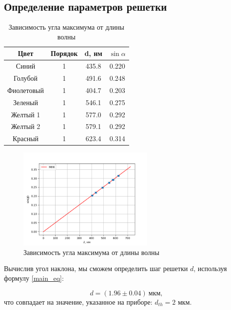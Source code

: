 \documentclass[a4paper]{article}
\begin{document}
\subsection{Определение параметров решетки}

\begin{table}[]
    \centering
    \begin{tabular}{|c|c|c|c|}
    \hline
    Цвет       & Порядок & d, нм & $\sin{\alpha}$ \\ \hline
    Синий      & 1       & 435.8 & 0.220          \\ \hline
    Голубой    & 1       & 491.6 & 0.248          \\ \hline
    Фиолетовый & 1       & 404.7 & 0.203          \\ \hline
    Зеленый    & 1       & 546.1 & 0.275          \\ \hline
    Желтый 1   & 1       & 577.0 & 0.292          \\ \hline
    Желтый 2   & 1       & 579.1 & 0.292          \\ \hline
    Красный    & 1       & 623.4 & 0.314          \\ \hline
    \end{tabular}
    \caption{Зависимость угла максимума от длины волны}
    \label{tab:my-table}
\end{table}

\begin{figure}[!h]
    \centering
    \includegraphics[width=0.6\textwidth]{fit_result.png}
    \caption{Зависимость угла максимума от длины волны}
    \label{fig:fit_result}
\end{figure}

\newpage

Вычислив угол наклона, мы сможем определить шаг решетки $d$, используя формулу \eqref{main_eq}:

\begin{equation}
    d = (1.96 \pm 0.04) \ \text{мкм},
\end{equation}
что совпадает на значение, указанное на приборе: $d_{th} = 2$ мкм.
\end{document}

